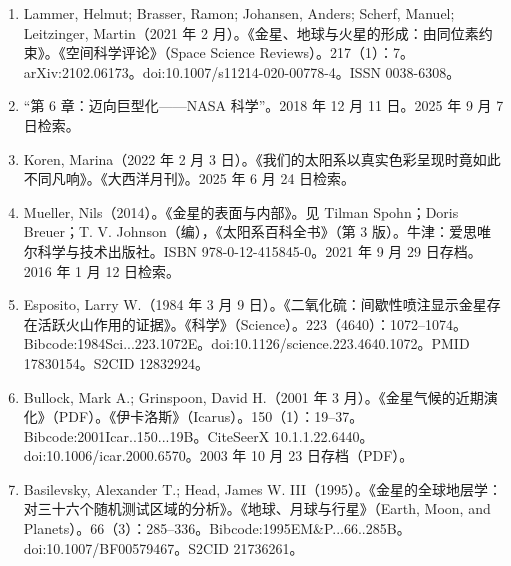 \begin{enumerate}
\item Lammer, Helmut; Brasser, Ramon; Johansen, Anders; Scherf, Manuel; Leitzinger, Martin（2021 年 2 月）。《金星、地球与火星的形成：由同位素约束》。《空间科学评论》（Space Science Reviews）。217（1）：7。arXiv:2102.06173。doi:10.1007/s11214-020-00778-4。ISSN 0038-6308。
\item “第 6 章：迈向巨型化——NASA 科学”。2018 年 12 月 11 日。2025 年 9 月 7 日检索。
\item Koren, Marina（2022 年 2 月 3 日）。《我们的太阳系以真实色彩呈现时竟如此不同凡响》。《大西洋月刊》。2025 年 6 月 24 日检索。
\item Mueller, Nils（2014）。《金星的表面与内部》。见 Tilman Spohn；Doris Breuer；T. V. Johnson（编），《太阳系百科全书》（第 3 版）。牛津：爱思唯尔科学与技术出版社。ISBN 978-0-12-415845-0。2021 年 9 月 29 日存档。2016 年 1 月 12 日检索。
\item Esposito, Larry W.（1984 年 3 月 9 日）。《二氧化硫：间歇性喷注显示金星存在活跃火山作用的证据》。《科学》（Science）。223（4640）：1072–1074。Bibcode:1984Sci...223.1072E。doi:10.1126/science.223.4640.1072。PMID 17830154。S2CID 12832924。
\item Bullock, Mark A.; Grinspoon, David H.（2001 年 3 月）。《金星气候的近期演化》（PDF）。《伊卡洛斯》（Icarus）。150（1）：19–37。Bibcode:2001Icar..150...19B。CiteSeerX 10.1.1.22.6440。doi:10.1006/icar.2000.6570。2003 年 10 月 23 日存档（PDF）。
\item Basilevsky, Alexander T.; Head, James W. III（1995）。《金星的全球地层学：对三十六个随机测试区域的分析》。《地球、月球与行星》（Earth, Moon, and Planets）。66（3）：285–336。Bibcode:1995EM&P...66..285B。doi:10.1007/BF00579467。S2CID 21736261。


\end{enumerate}
